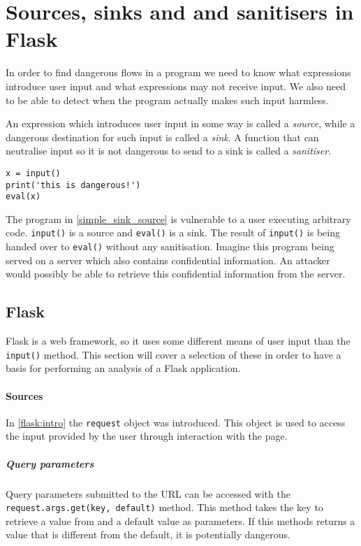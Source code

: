 \section{Sources, sinks and  and sanitisers in Flask}
In order to find dangerous flows in a program we need to know what expressions introduce user input and what expressions may not receive input.
We also need to be able to detect when the program actually makes such input harmless.

An expression which introduces user input in some way is called a \emph{source}, while a dangerous destination for such input is called a \emph{sink}.
A function that can neutralise input so it is not dangerous to send to a sink is called a \emph{sanitiser}.

\begin{lstlisting}[style=python, caption={A simple vulnerable program}, label=simple_sink_source]
x = input()
print('this is dangerous!')
eval(x)
\end{lstlisting}

The program in \cref{simple_sink_source} is vulnerable to a user executing arbitrary code.
\texttt{input()} is a source and \texttt{eval()} is a sink.
The result of \texttt{input()} is being handed over to \texttt{eval()} without any sanitisation.
Imagine this program being served on a server which also contains confidential information.
An attacker would possibly be able to retrieve this confidential information from the server.

\subsection{Flask}
Flask is a web framework, so it uses some different means of user input than the \texttt{input()} method.
This section will cover a selection of these in order to have a basis for performing an analysis of a Flask application.

\paragraph{Sources}
In \cref{flask:intro} the \texttt{request} object was introduced.
This object is used to access the input provided by the user through interaction with the page.

\subparagraph{Query parameters}
Query parameters submitted to the URL can be accessed with the \texttt{request.args.get(key, default)} method.
This method takes the key to retrieve a value from and a default value as parameters.
If this methods returns a value that is different from the default, it is potentially dangerous.

